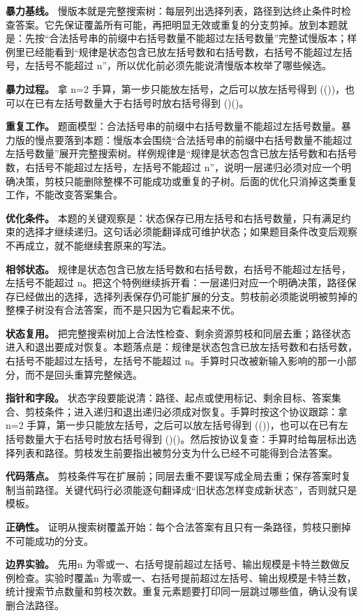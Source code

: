 \textbf{暴力基线。} 慢版本就是完整搜索树：每层列出选择列表，路径到达终止条件时检查答案。它先保证覆盖所有可能，再把明显无效或重复的分支剪掉。放到本题就是：先按“合法括号串的前缀中右括号数量不能超过左括号数量”完整试慢版本；样例里已经能看到“规律是状态包含已放左括号数和右括号数，右括号不能超过左括号，左括号不能超过 n”，所以优化前必须先能说清慢版本枚举了哪些候选。

\textbf{暴力过程。} 拿 n=2 手算，第一步只能放左括号，之后可以放左括号得到 (())，也可以在已有左括号数量大于右括号时放右括号得到 ()()。

\textbf{重复工作。} 题面模型：合法括号串的前缀中右括号数量不能超过左括号数量。暴力版的慢点要落到本题：慢版本会围绕“合法括号串的前缀中右括号数量不能超过左括号数量”展开完整搜索树。样例规律是“规律是状态包含已放左括号数和右括号数，右括号不能超过左括号，左括号不能超过 n”，说明一层递归必须对应一个明确决策，剪枝只能删除整棵不可能成功或重复的子树。后面的优化只消掉这类重复工作，不能改变答案集合。

\textbf{优化条件。} 本题的关键观察是：状态保存已用左括号和右括号数量，只有满足约束的选择才继续递归。这句话必须能翻译成可维护状态；如果题目条件改变后观察不再成立，就不能继续套原来的写法。

\textbf{相邻状态。} 规律是状态包含已放左括号数和右括号数，右括号不能超过左括号，左括号不能超过 n。把这个特例继续拆开看：一层递归对应一个明确决策，路径保存已经做出的选择，选择列表保存仍可能扩展的分支。剪枝前必须能说明被剪掉的整棵子树没有合法答案，而不是只因为它看起来不优。

\textbf{状态复用。} 把完整搜索树加上合法性检查、剩余资源剪枝和同层去重；路径状态进入和退出要成对恢复。本题落点是：规律是状态包含已放左括号数和右括号数，右括号不能超过左括号，左括号不能超过 n。手算时只改被新输入影响的那一小部分，而不是回头重算完整候选。

\textbf{指针和字段。} 状态字段要能说清：路径、起点或使用标记、剩余目标、答案集合、剪枝条件；进入递归和退出递归必须成对恢复。手算时按这个协议跟踪：拿 n=2 手算，第一步只能放左括号，之后可以放左括号得到 (())，也可以在已有左括号数量大于右括号时放右括号得到 ()()。然后按协议复查：手算时给每层标出选择列表和路径。剪枝发生前要指出被剪分支为什么已经不可能得到合法答案。

\textbf{代码落点。} 剪枝条件写在扩展前；同层去重不要误写成全局去重；保存答案时复制当前路径。关键代码行必须能逐句翻译成“旧状态怎样变成新状态”，否则就只是模板。

\textbf{正确性。} 证明从搜索树覆盖开始：每个合法答案有且只有一条路径，剪枝只删掉不可能成功的分支。

\textbf{边界实验。} 先用n 为零或一、右括号提前超过左括号、输出规模是卡特兰数做反例检查。实验时覆盖n 为零或一、右括号提前超过左括号、输出规模是卡特兰数，统计搜索节点数量和剪枝次数。重复元素题要打印同一层跳过哪些值，确认没有误删合法路径。

